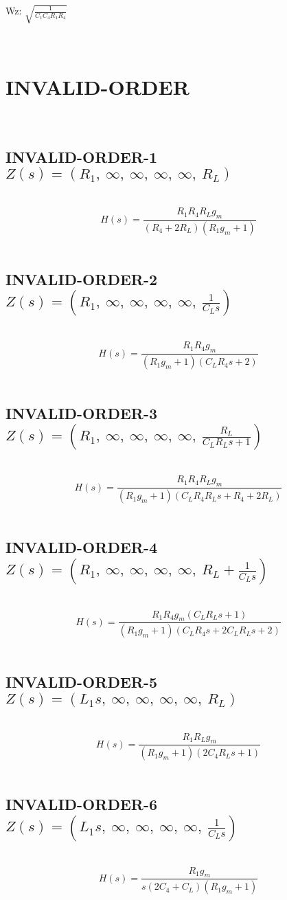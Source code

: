 \documentclass{article}
\begin{document}
Wz: $\sqrt{\frac{1}{C_{1} C_{4} R_{1} R_{4}}}$\ 

\ 

\section{INVALID-ORDER}\ 
\subsection{INVALID-ORDER-1 $Z(s) = \left( R_{1}, \  \infty, \  \infty, \  \infty, \  \infty, \  R_{L}\right)$ } \ 
\textbf{\[H(s) = \frac{R_{1} R_{4} R_{L} g_{m}}{\left(R_{4} + 2 R_{L}\right) \left(R_{1} g_{m} + 1\right)}\] } \ 
\subsection{INVALID-ORDER-2 $Z(s) = \left( R_{1}, \  \infty, \  \infty, \  \infty, \  \infty, \  \frac{1}{C_{L} s}\right)$ } \ 
\textbf{\[H(s) = \frac{R_{1} R_{4} g_{m}}{\left(R_{1} g_{m} + 1\right) \left(C_{L} R_{4} s + 2\right)}\] } \ 
\subsection{INVALID-ORDER-3 $Z(s) = \left( R_{1}, \  \infty, \  \infty, \  \infty, \  \infty, \  \frac{R_{L}}{C_{L} R_{L} s + 1}\right)$ } \ 
\textbf{\[H(s) = \frac{R_{1} R_{4} R_{L} g_{m}}{\left(R_{1} g_{m} + 1\right) \left(C_{L} R_{4} R_{L} s + R_{4} + 2 R_{L}\right)}\] } \ 
\subsection{INVALID-ORDER-4 $Z(s) = \left( R_{1}, \  \infty, \  \infty, \  \infty, \  \infty, \  R_{L} + \frac{1}{C_{L} s}\right)$ } \ 
\textbf{\[H(s) = \frac{R_{1} R_{4} g_{m} \left(C_{L} R_{L} s + 1\right)}{\left(R_{1} g_{m} + 1\right) \left(C_{L} R_{4} s + 2 C_{L} R_{L} s + 2\right)}\] } \ 
\subsection{INVALID-ORDER-5 $Z(s) = \left( L_{1} s, \  \infty, \  \infty, \  \infty, \  \infty, \  R_{L}\right)$ } \ 
\textbf{\[H(s) = \frac{R_{1} R_{L} g_{m}}{\left(R_{1} g_{m} + 1\right) \left(2 C_{4} R_{L} s + 1\right)}\] } \ 
\subsection{INVALID-ORDER-6 $Z(s) = \left( L_{1} s, \  \infty, \  \infty, \  \infty, \  \infty, \  \frac{1}{C_{L} s}\right)$ } \ 
\textbf{\[H(s) = \frac{R_{1} g_{m}}{s \left(2 C_{4} + C_{L}\right) \left(R_{1} g_{m} + 1\right)}\] } \ 
\end{document}
